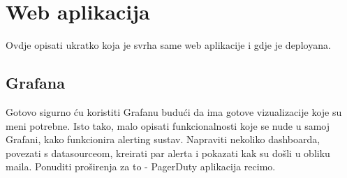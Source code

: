 \chapter{Web aplikacija}

Ovdje opisati ukratko koja je svrha same web aplikacije i gdje je deployana. 

\section{Grafana}

Gotovo sigurno ću koristiti Grafanu budući da ima gotove vizualizacije koje su meni potrebne. Isto tako, malo opisati funkcionalnosti koje se nude u samoj Grafani, kako funkcionira alerting sustav. Napraviti nekoliko dashboarda, povezati s datasourceom, kreirati par alerta i pokazati kak su došli u obliku maila. Ponuditi proširenja za to - PagerDuty aplikacija recimo.